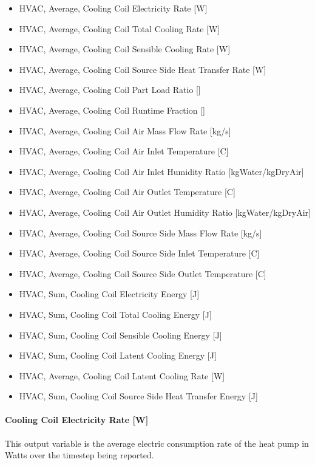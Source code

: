 \begin{itemize}
\item
  HVAC, Average, Cooling Coil Electricity Rate {[}W{]}
\item
  HVAC, Average, Cooling Coil Total Cooling Rate {[}W{]}
\item
  HVAC, Average, Cooling Coil Sensible Cooling Rate {[}W{]}
\item
  HVAC, Average, Cooling Coil Source Side Heat Transfer Rate {[}W{]}
\item
  HVAC, Average, Cooling Coil Part Load Ratio {[]}
\item
  HVAC, Average, Cooling Coil Runtime Fraction {[]}
\item
  HVAC, Average, Cooling Coil Air Mass Flow Rate {[}kg/s{]}
\item
  HVAC, Average, Cooling Coil Air Inlet Temperature {[}C{]}
\item
  HVAC, Average, Cooling Coil Air Inlet Humidity Ratio {[}kgWater/kgDryAir{]}
\item
  HVAC, Average, Cooling Coil Air Outlet Temperature {[}C{]}
\item
  HVAC, Average, Cooling Coil Air Outlet Humidity Ratio {[}kgWater/kgDryAir{]}
\item
  HVAC, Average, Cooling Coil Source Side Mass Flow Rate {[}kg/s{]}
\item
  HVAC, Average, Cooling Coil Source Side Inlet Temperature {[}C{]}
\item
  HVAC, Average, Cooling Coil Source Side Outlet Temperature {[}C{]}
\item
  HVAC, Sum, Cooling Coil Electricity Energy {[}J{]}
\item
  HVAC, Sum, Cooling Coil Total Cooling Energy {[}J{]}
\item
  HVAC, Sum, Cooling Coil Sensible Cooling Energy {[}J{]}
\item
  HVAC, Sum, Cooling Coil Latent Cooling Energy {[}J{]}
\item
  HVAC, Average, Cooling Coil Latent Cooling Rate {[}W{]}
\item
  HVAC, Sum, Cooling Coil Source Side Heat Transfer Energy {[}J{]}
\end{itemize}

\paragraph{Cooling Coil Electricity Rate {[}W{]}}\label{cooling-coil-electric-power-w-2}

This output variable is the average electric consumption rate of the heat pump in Watts over the timestep being reported.

